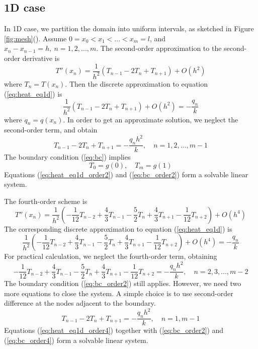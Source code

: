 \documentclass{article}
\begin{document}
\subsection{1D case}
In 1D case, we partition the domain into uniform intervals, as sketched in Figure \ref{fig:mesh}().
Assume $0 = x_0 < x_1 < ... < x_m = l$, and $x_n - x_{n-1} = h,\  n = 1, 2, ..., m$.
The second-order approximation to the second-order derivative is
    $$T''(x_n) = \frac{1}{h^2}\left(T_{n-1} - 2 T_n + T_{n+1}\right) + O(h^2)$$
where $T_n = T(x_n)$.
Then the discrete approximation to equation (\ref{eq:heat_eq1d}) is
    $$\frac{1}{h^2}\left(T_{n-1} - 2 T_n + T_{n+1}\right) + O(h^2) = -\frac{q_n}{k}$$
where $q_n = q(x_n)$. In order to get an approximate solution, we neglect the second-order term, and obtain
\begin{equation} \label{eq:heat_eq1d_order2}
    T_{n-1} - 2 T_n + T_{n+1} = -\frac{q_n h^2}{k}, \quad n = 1, 2, ..., m-1
\end{equation}
The boundary condition (\ref{eq:bc}) implies
\begin{equation} \label{eq:bc_order2}
    T_0 = g(0), \quad T_m = g(1)
\end{equation}
Equations (\ref{eq:heat_eq1d_order2}) and (\ref{eq:bc_order2}) form a solvable linear system.

The fourth-order scheme is
    $$T''(x_n) = \frac{1}{h^2}\left( -\frac{1}{12}T_{n-2} + \frac{4}{3}T_{n-1} - \frac{5}{2}T_n + \frac{4}{3}T_{n+1}
    - \frac{1}{12}T_{n+2} \right) + O(h^4)$$
The corresponding discrete approximation to equation (\ref{eq:heat_eq1d}) is
    $$ \frac{1}{h^2}\left( -\frac{1}{12}T_{n-2} + \frac{4}{3}T_{n-1} - \frac{5}{2}T_n + \frac{4}{3}T_{n+1}
    - \frac{1}{12}T_{n+2} \right) + O(h^4) = -\frac{q_n}{k} $$
For practical calculation, we neglect the fourth-order term, obtaining
\begin{equation} \label{eq:heat_eq1d_order4}
     -\frac{1}{12}T_{n-2} + \frac{4}{3}T_{n-1} - \frac{5}{2}T_n + \frac{4}{3}T_{n+1}
    - \frac{1}{12}T_{n+2}  = -\frac{q_n h^2}{k}, \quad n = 2, 3, ..., m-2
\end{equation}
The boundary condition (\ref{eq:bc_order2}) still applies. However, we need two more equations to close the system.
A simple choice is to use second-order difference at the nodes adjacent to the boundary.
\begin{equation} \label{eq:bc_order4}
    T_{n-1} - 2 T_n + T_{n+1} = -\frac{q_n h^2}{k}, \quad n = 1, m-1
\end{equation}
Equations (\ref{eq:heat_eq1d_order4}) together with (\ref{eq:bc_order2}) and (\ref{eq:bc_order4}) form a solvable linear system.
\end{document}
